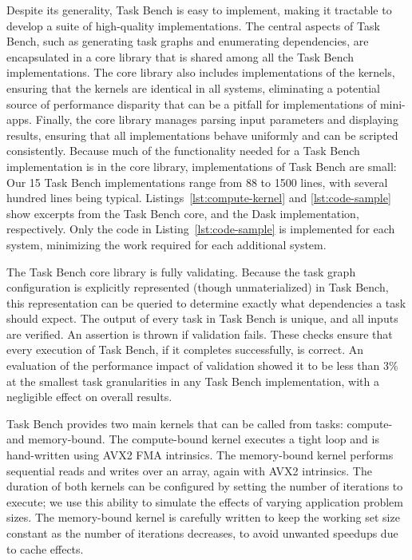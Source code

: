 Despite its generality, Task Bench is easy to implement, making it
tractable to develop a suite of high-quality implementations. The central aspects of Task Bench, such as generating
task graphs and enumerating dependencies, are encapsulated in a core
library that is shared among all the Task Bench implementations. The
core library also includes implementations of the kernels, ensuring
that the kernels are identical in all systems, eliminating a potential
source of performance disparity that can be a pitfall for
implementations of mini-apps. Finally, the core library manages
parsing input parameters and displaying results,
ensuring that all implementations behave uniformly and can
be scripted consistently. Because much of the functionality needed for
a Task Bench implementation is in the core library, implementations of
Task Bench are small: Our 15 Task Bench implementations range from 88
to 1500 lines, with several hundred lines being
typical. Listings~\ref{lst:compute-kernel} and \ref{lst:code-sample}
show excerpts from the Task Bench core, and the Dask implementation,
respectively. Only the code in Listing~\ref{lst:code-sample} is
implemented for each system, minimizing the work required for each additional system.






The Task Bench core library is fully
validating. Because the task graph configuration is explicitly
represented (though unmaterialized) in Task Bench, this representation
can be queried to determine exactly what dependencies a task should
expect. The output of every task in Task Bench is unique,
and all inputs are verified. An assertion is thrown if validation
fails. These checks ensure that every execution of Task Bench, if it
completes successfully, is correct. An evaluation of the performance impact of
validation showed it to be less than 3\% at the smallest task
granularities in any Task Bench implementation, with a negligible
effect on overall results.

Task Bench provides two main kernels that can be called from tasks:
compute- and memory-bound. The compute-bound
kernel executes a tight loop and is hand-written using AVX2 FMA
intrinsics. The memory-bound kernel performs sequential reads and
writes over an array, again with AVX2
intrinsics. The duration of both kernels can be configured by setting
the number of iterations to execute; we use this ability to simulate
the effects of varying application problem sizes. The memory-bound
kernel is carefully written to keep the working set size constant as
the number of iterations decreases, to avoid unwanted speedups due to
cache effects.
